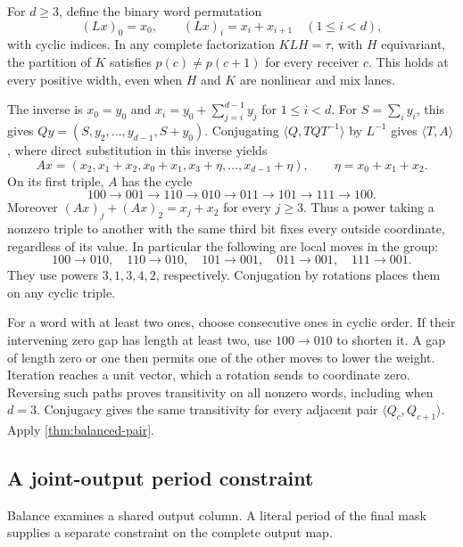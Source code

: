 \begin{proposition}\label{prop:anchored}
For $d\ge3$, define the binary word permutation
\[
 (Lx)_0=x_0,\qquad (Lx)_i=x_i+x_{i+1}\quad(1\le i<d),
\]
with cyclic indices.  In any complete factorization $KLH=\tau$, with
$H$ equivariant, the partition of $K$ satisfies $p(c)\ne p(c+1)$ for
every receiver $c$.  This holds at every positive width, even when
$H$ and $K$ are nonlinear and mix lanes.
\end{proposition}
\begin{outline}
The inverse is $x_0=y_0$ and
$x_i=y_0+\sum_{j=i}^{d-1}y_j$ for $1\le i<d$.
For $S=\sum_i y_i$, this gives
$Qy=(S,y_2,\ldots,y_{d-1},S+y_0)$.
Conjugating $\langle Q,TQT^{-1}\rangle$ by $L^{-1}$ gives
$\langle T,A\rangle$, where direct substitution in this inverse yields
\[
 Ax=(x_2,x_1+x_2,x_0+x_1,x_3+\eta,\ldots,x_{d-1}+\eta),
 \qquad\eta=x_0+x_1+x_2.
\]
On its first triple, $A$ has the cycle
\[
 100\to001\to110\to010\to011\to101\to111\to100.
\]
Moreover $(Ax)_j+(Ax)_2=x_j+x_2$ for every $j\ge3$.
Thus a power taking a nonzero triple to another with the same third
bit fixes every outside coordinate, regardless of its value.  In
particular the following are local moves in the group:
\[
 100\to010,\quad110\to010,\quad101\to001,
 \quad011\to001,\quad111\to001.
\]
They use powers $3,1,3,4,2$, respectively.  Conjugation by rotations
places them on any cyclic triple.

For a word with at least two ones, choose consecutive ones in cyclic
order.  If their intervening zero gap has length at least two, use
$100\to010$ to shorten it.  A gap of length zero or one then permits
one of the other moves to lower the weight.  Iteration reaches a unit
vector, which a rotation sends to coordinate zero.  Reversing such
paths proves transitivity on all nonzero words, including when $d=3$.
Conjugacy gives the same transitivity for every adjacent pair
$\langle Q_c,Q_{c+1}\rangle$.  Apply \cref{thm:balanced-pair}.
\end{outline}

\subsection{A joint-output period constraint}

Balance examines a shared output column.  A literal period of the final
mask supplies a separate constraint on the complete output map.


